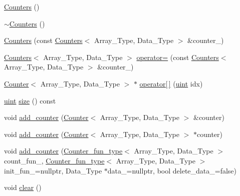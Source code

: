 \begin{DoxyCompactItemize}
\item 
\hyperlink{classbarry_1_1_counters_adebe3273f50b48637efe1b3e73e0dcc6}{Counters} ()
\item 
\hyperlink{classbarry_1_1_counters_acc54ef822eea4170573142ecb189318d}{$\sim$\+Counters} ()
\item 
\hyperlink{classbarry_1_1_counters_a178c0267c1f52a36e10e9d257a21a224}{Counters} (const \hyperlink{classbarry_1_1_counters}{Counters}$<$ Array\+\_\+\+Type, Data\+\_\+\+Type $>$ \&counter\+\_\+)
\item 
\hyperlink{classbarry_1_1_counters}{Counters}$<$ Array\+\_\+\+Type, Data\+\_\+\+Type $>$ \hyperlink{classbarry_1_1_counters_a0edeb22b0b1640f7ada1ef47a30ac486}{operator=} (const \hyperlink{classbarry_1_1_counters}{Counters}$<$ Array\+\_\+\+Type, Data\+\_\+\+Type $>$ \&counter\+\_\+)
\item 
\hyperlink{classbarry_1_1_counter}{Counter}$<$ Array\+\_\+\+Type, Data\+\_\+\+Type $>$ $\ast$ \hyperlink{classbarry_1_1_counters_a9c3ff72b5e24a299e3c1aecad0ea5eb2}{operator\mbox{[}$\,$\mbox{]}} (\hyperlink{namespacebarry_a11dfc53ddb4672278319aa04f1e09a6c}{uint} idx)
\item 
\hyperlink{namespacebarry_a11dfc53ddb4672278319aa04f1e09a6c}{uint} \hyperlink{classbarry_1_1_counters_aa70f3d91d0f69ff8f4887930efaa0411}{size} () const
\item 
void \hyperlink{classbarry_1_1_counters_a5b5dafc7a3e0eedae400457f69937613}{add\+\_\+counter} (\hyperlink{classbarry_1_1_counter}{Counter}$<$ Array\+\_\+\+Type, Data\+\_\+\+Type $>$ \&counter)
\item 
void \hyperlink{classbarry_1_1_counters_a74f054aa9ea64103c2d9f79f115777d4}{add\+\_\+counter} (\hyperlink{classbarry_1_1_counter}{Counter}$<$ Array\+\_\+\+Type, Data\+\_\+\+Type $>$ $\ast$counter)
\item 
void \hyperlink{classbarry_1_1_counters_a4ee47504f9c76892c6028619e6b138ee}{add\+\_\+counter} (\hyperlink{namespacebarry_abaaae3200da8e4b7faac3c04fe9c3081}{Counter\+\_\+fun\+\_\+type}$<$ Array\+\_\+\+Type, Data\+\_\+\+Type $>$ count\+\_\+fun\+\_\+, \hyperlink{namespacebarry_abaaae3200da8e4b7faac3c04fe9c3081}{Counter\+\_\+fun\+\_\+type}$<$ Array\+\_\+\+Type, Data\+\_\+\+Type $>$ init\+\_\+fun\+\_\+=nullptr, Data\+\_\+\+Type $\ast$data\+\_\+=nullptr, bool delete\+\_\+data\+\_\+=false)
\item 
void \hyperlink{classbarry_1_1_counters_ae4635c154970a13ce88d2e982fe7dab3}{clear} ()
\end{DoxyCompactItemize}


